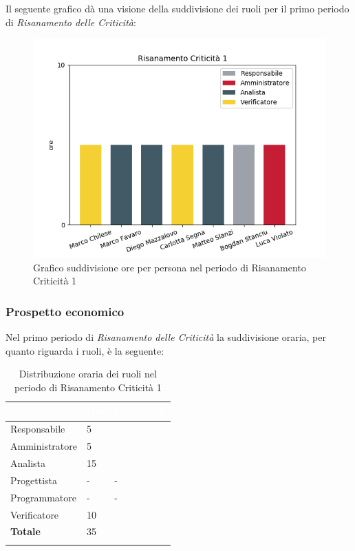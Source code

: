 Il seguente grafico dà una visione della suddivisione dei ruoli per il primo periodo di \textit{Risanamento delle Criticità}:
\begin{figure}[H]
  \centering
  \includegraphics[width=0.8\linewidth]{./images/fig_rc1.png}
  \caption{Grafico suddivisione ore per persona nel periodo di Risanamento Criticità 1}
  \label{fig:grafico suddivione ruoli rc1}
\end{figure}

\subsubsection{Prospetto economico}
Nel primo periodo di \textit{Risanamento delle Criticità} la suddivisione oraria, per quanto riguarda i ruoli, è la seguente: 


\begin{longtable}{| C{.30\textwidth}| C{.15\textwidth}| C{.20\textwidth}|}
\hline
{}\textbf{\textcolor{white}{Ruolo}} & \textbf{\textcolor{white}{Ore}} & \textbf{\textcolor{white}{Costo in \euro}} \\
\hline 
Responsabile & 5 &  \\
\hline
{}Amministratore & 5 &  \\
\hline
Analista & 15 &  \\
\hline
{}Progettista & - & - \\
\hline
Programmatore & - & - \\
\hline
{}Verificatore & 10 & \\
\hline
\textbf{Totale} & 35 &  \\
\hline


\caption{Distribuzione oraria dei ruoli nel periodo di Risanamento Criticità 1}
\label{Distribuzione oraria ruoli del periodo di rc1}
\end{longtable}

